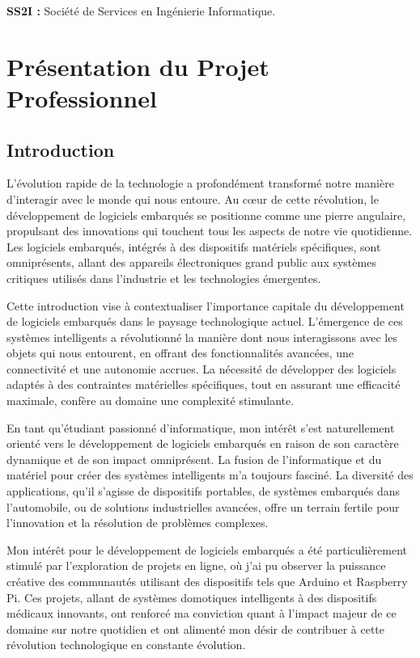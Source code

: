 \documentclass[a4paper,12pt]{report}
\begin{document}
\textbf{SS2I :} Société de Services en Ingénierie Informatique.

\newpage
\section{Présentation du Projet Professionnel}

\subsection*{Introduction}
L'évolution rapide de la technologie a profondément transformé notre manière d'interagir avec le monde qui nous entoure. Au cœur de cette révolution, le développement de logiciels embarqués se positionne comme une pierre angulaire, propulsant des innovations qui touchent tous les aspects de notre vie quotidienne. Les logiciels embarqués, intégrés à des dispositifs matériels spécifiques, sont omniprésents, allant des appareils électroniques grand public aux systèmes critiques utilisés dans l'industrie et les technologies émergentes.

Cette introduction vise à contextualiser l'importance capitale du développement de logiciels embarqués dans le paysage technologique actuel. L'émergence de ces systèmes intelligents a révolutionné la manière dont nous interagissons avec les objets qui nous entourent, en offrant des fonctionnalités avancées, une connectivité et une autonomie accrues. La nécessité de développer des logiciels adaptés à des contraintes matérielles spécifiques, tout en assurant une efficacité maximale, confère au domaine une complexité stimulante.

En tant qu'étudiant passionné d'informatique, mon intérêt s'est naturellement orienté vers le développement de logiciels embarqués en raison de son caractère dynamique et de son impact omniprésent. La fusion de l'informatique et du matériel pour créer des systèmes intelligents m'a toujours fasciné. La diversité des applications, qu'il s'agisse de dispositifs portables, de systèmes embarqués dans l'automobile, ou de solutions industrielles avancées, offre un terrain fertile pour l'innovation et la résolution de problèmes complexes.

Mon intérêt pour le développement de logiciels embarqués a été particulièrement stimulé par l'exploration de projets en ligne, où j'ai pu observer la puissance créative des communautés utilisant des dispositifs tels que Arduino et Raspberry Pi. Ces projets, allant de systèmes domotiques intelligents à des dispositifs médicaux innovants, ont renforcé ma conviction quant à l'impact majeur de ce domaine sur notre quotidien et ont alimenté mon désir de contribuer à cette révolution technologique en constante évolution.
\end{document}
